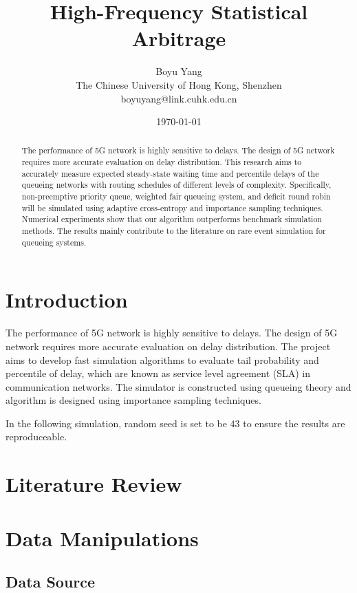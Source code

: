 \documentclass{article}
\title{High-Frequency Statistical Arbitrage}
\date{\today}	%
\author{Boyu Yang\\The Chinese University of Hong Kong, Shenzhen\\boyuyang@link.cuhk.edu.cn}
\begin{document}
\maketitle

\begin{abstract}
	The performance of 5G network is highly sensitive to delays. The design of 5G network requires more accurate evaluation on delay distribution. This research aims to accurately measure expected steady-state waiting time and percentile delays of the queueing networks with routing schedules of different levels of complexity. Specifically, non-preemptive priority queue, weighted fair queueing system, and deficit round robin 
	will be simulated using adaptive cross-entropy and importance sampling techniques. Numerical experiments show that our algorithm outperforms benchmark simulation methods. The results mainly contribute to the literature on rare event simulation for queueing systems.
\end{abstract}




\section{Introduction}
The performance of 5G network is highly sensitive to delays. The design of 5G network requires more accurate evaluation on delay distribution. The project aims to develop fast simulation algorithms to evaluate tail probability and percentile of delay, which are known as service level agreement (SLA) in communication networks. 
	The simulator is constructed using queueing theory and algorithm is designed using importance sampling techniques.

In the following simulation, random seed is set to be 43 to ensure the results are reproduceable.

\section{Literature Review}


\section{Data Manipulations}

\subsection{Data Source}
\end{document}
